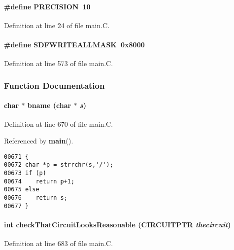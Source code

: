 \paragraph{\setlength{\rightskip}{0pt plus 5cm}\#define PRECISION\ 10}\hfill



Definition at line 24 of file main.C.\label{main.C_a5}
\paragraph{\setlength{\rightskip}{0pt plus 5cm}\#define SDFWRITEALLMASK\ 0x8000}\hfill



Definition at line 573 of file main.C.

\subsubsection{Function Documentation}
\label{main.C_a18}
\paragraph{\setlength{\rightskip}{0pt plus 5cm}char $\ast$ bname (char $\ast$ {\em s})\hspace{0.3cm}{\tt  [static]}}\hfill



Definition at line 670 of file main.C.

Referenced by {\bf main}().\small\begin{verbatim}00671 {
00672 char *p = strrchr(s,'/');
00673 if (p)
00674    return p+1;
00675 else
00676    return s;
00677 }
\end{verbatim}\normalsize 
\label{main.C_a13}
\paragraph{\setlength{\rightskip}{0pt plus 5cm}int check\-That\-Circuit\-Looks\-Reasonable (CIRCUITPTR {\em thecircuit})\hspace{0.3cm}{\tt  [static]}}\hfill



Definition at line 683 of file main.C.

